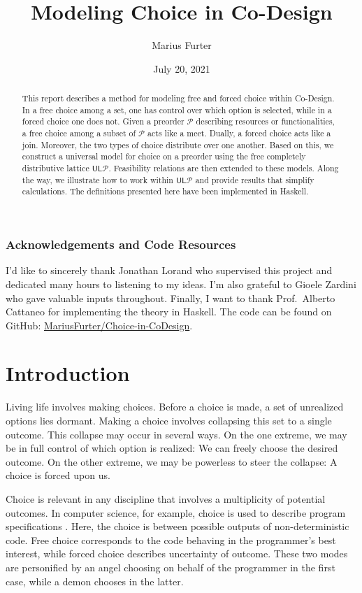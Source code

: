 \documentclass[12pt]{article}
\title{Modeling Choice in Co-Design}
\author{Marius Furter}
\date{July 20, 2021}
\theoremstyle{definition}
\theoremstyle{plain}
\theoremstyle{plain}
\theoremstyle{plain}
\theoremstyle{plain}
\theoremstyle{remark}
\theoremstyle{remark}
\newcommand{\mc}[1]{\mathcal{#1}}
\newcommand{\low}{\mathsf{L}}
\newcommand{\upper}{\mathsf{U}}
\begin{document}
\maketitle

\begin{abstract}
	This report describes a method for modeling free and forced choice within Co-Design. In a free choice among a set, one has control over which option is selected, while in a forced choice one does not. Given a preorder $\mc{P}$ describing resources or functionalities, a free choice among a subset of $\mc{P}$ acts like a meet. Dually, a forced choice acts like a join. Moreover, the two types of choice distribute over one another. Based on this, we construct a universal model for choice on a preorder using the free completely distributive lattice $\upper\low\mc{P}$. Feasibility relations are then extended to these models. Along the way, we illustrate how to work within $\upper\low\mc{P}$ and provide results that simplify calculations. The definitions presented here have been implemented in Haskell.
\end{abstract}

\vspace{3.5cm}
\subsubsection*{\centering Acknowledgements and Code Resources}
I'd like to sincerely thank Jonathan Lorand who supervised this project and dedicated many hours to listening to my ideas. I'm also grateful to Gioele Zardini who gave valuable inputs throughout. Finally, I want to thank Prof.~Alberto Cattaneo for implementing the theory in Haskell. The code can be found on GitHub: \href{https://github.com/MariusFurter/Choice-in-CoDesign}{MariusFurter/Choice-in-CoDesign}.
\newpage
\tableofcontents
\newpage

\section{Introduction}
Living life involves making choices. Before a choice is made, a set of unrealized options lies dormant. Making a choice involves collapsing this set to a single outcome. This collapse may occur in several ways. On the one extreme, we may be in full control of which option is realized: We can freely choose the desired outcome. On the other extreme, we may be powerless to steer the collapse: A choice is forced upon us.

Choice is relevant in any discipline that involves a multiplicity of potential outcomes. In computer science, for example, choice is used to describe program specifications \cite{Martin2007,Morris2004}. Here, the choice is between possible outputs of non-deterministic code. Free choice corresponds to the code behaving in the programmer's best interest, while forced choice describes uncertainty of outcome. These two modes are personified by an angel choosing on behalf of the programmer in the first case, while a demon chooses in the latter.
\end{document}

